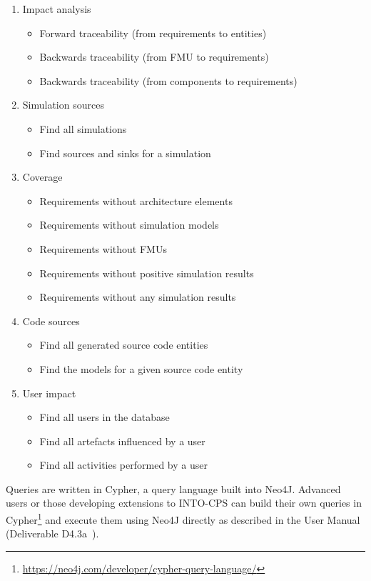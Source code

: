 \begin{enumerate}[noitemsep]
  \item Impact analysis
  \begin{itemize}
    \item Forward traceability (from requirements to entities)
    \item Backwards traceability (from FMU to requirements)
    \item Backwards traceability (from components to requirements)
  \end{itemize}
  \item Simulation sources
  \begin{itemize}
    \item Find all simulations
    \item Find sources and sinks for a simulation
  \end{itemize}
  \item Coverage
  \begin{itemize}
    \item Requirements without architecture elements
    \item Requirements without simulation models
    \item Requirements without FMUs
    \item Requirements without positive simulation results
    \item Requirements without any simulation results
  \end{itemize}
  \item Code sources
  \begin{itemize}
    \item Find all generated source code entities
    \item Find the models for a given source code entity
  \end{itemize}
  \item User impact
  \begin{itemize}
    \item Find all users in the database
    \item Find all artefacts influenced by a user
    \item Find all activities performed by a user
  \end{itemize}
\end{enumerate}

Queries are written in Cypher, a query language built into Neo4J. Advanced users or those developing extensions to INTO-CPS can build their own queries in Cypher\footnote{\url{https://neo4j.com/developer/cypher-query-language/}} and execute them using Neo4J directly as described in the User Manual (Deliverable D4.3a~\cite{INTOCPSD4.3a}).


